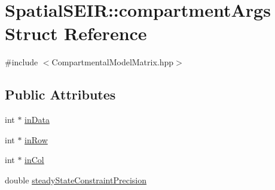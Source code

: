 \hypertarget{structSpatialSEIR_1_1compartmentArgs}{\section{Spatial\-S\-E\-I\-R\-:\-:compartment\-Args Struct Reference}
\label{structSpatialSEIR_1_1compartmentArgs}
}


{\ttfamily \#include $<$Compartmental\-Model\-Matrix.\-hpp$>$}

\subsection*{Public Attributes}
\begin{DoxyCompactItemize}
\item 
int $\ast$ \hyperlink{structSpatialSEIR_1_1compartmentArgs_a02fa1783ef4a4a0d8392e262801d9016}{in\-Data}
\item 
int $\ast$ \hyperlink{structSpatialSEIR_1_1compartmentArgs_a5a19df565b3856bb4ba528557c13c0e1}{in\-Row}
\item 
int $\ast$ \hyperlink{structSpatialSEIR_1_1compartmentArgs_a099157d615a905760cbfffecfc1ae601}{in\-Col}
\item 
double \hyperlink{structSpatialSEIR_1_1compartmentArgs_a6ec9286a8db3ca4bfb153932d4c0fe30}{steady\-State\-Constraint\-Precision}
\end{DoxyCompactItemize}


